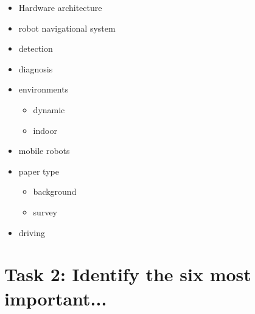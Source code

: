 \documentclass{article}
\begin{document}
\begin{itemize}
\begin{itemize}
    \end{itemize} 
    \item Hardware architecture
    \item robot navigational system
    \item detection
    \item diagnosis
    \item environments
    \begin{itemize}
        \item dynamic
        \item indoor
    \end{itemize}
    \item mobile robots
    \item paper type
    \begin{itemize}
        \item background
        \item survey
    \end{itemize}
    \item driving
\end{itemize}

\break


\section*{Task 2: Identify the six most important...}
\end{document}
